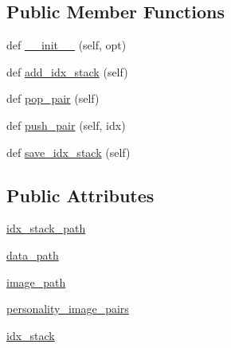 \subsection*{Public Member Functions}
\begin{DoxyCompactItemize}
\item 
def \hyperlink{classpersonality__captions_1_1worlds_1_1PersonalityAndImageGenerator_a2c0bf3982f19884f2ac82873c1b9f5ce}{\+\_\+\+\_\+init\+\_\+\+\_\+} (self, opt)
\item 
def \hyperlink{classpersonality__captions_1_1worlds_1_1PersonalityAndImageGenerator_ac246d3fe0a05e842220e73ff837eb2ee}{add\+\_\+idx\+\_\+stack} (self)
\item 
def \hyperlink{classpersonality__captions_1_1worlds_1_1PersonalityAndImageGenerator_ade0cb023a2efc492a3eedea9c670ef51}{pop\+\_\+pair} (self)
\item 
def \hyperlink{classpersonality__captions_1_1worlds_1_1PersonalityAndImageGenerator_a9d4d745f2bc678ff0cae5048f0efc047}{push\+\_\+pair} (self, idx)
\item 
def \hyperlink{classpersonality__captions_1_1worlds_1_1PersonalityAndImageGenerator_af76fb5f34ce3555d6e56edf5ad8de390}{save\+\_\+idx\+\_\+stack} (self)
\end{DoxyCompactItemize}
\subsection*{Public Attributes}
\begin{DoxyCompactItemize}
\item 
\hyperlink{classpersonality__captions_1_1worlds_1_1PersonalityAndImageGenerator_ad87c83e39fd00d959a3170c67b560b79}{idx\+\_\+stack\+\_\+path}
\item 
\hyperlink{classpersonality__captions_1_1worlds_1_1PersonalityAndImageGenerator_a8cf3e5e992828f839a1431fa76550d1c}{data\+\_\+path}
\item 
\hyperlink{classpersonality__captions_1_1worlds_1_1PersonalityAndImageGenerator_a452cf9ea9acd062f28f5136bed609bb0}{image\+\_\+path}
\item 
\hyperlink{classpersonality__captions_1_1worlds_1_1PersonalityAndImageGenerator_a28343ba1f0f6ee18157127f40bcac251}{personality\+\_\+image\+\_\+pairs}
\item 
\hyperlink{classpersonality__captions_1_1worlds_1_1PersonalityAndImageGenerator_abc37ed0e7d15c12a6ba01c75b770dfee}{idx\+\_\+stack}
\end{DoxyCompactItemize}


